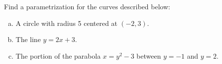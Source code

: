 \documentclass[12pt,letterpaper]{exam}
\begin{document}
\begin{questions}
\newpage
{} Find a parametrization for the curves described below:
	\begin{enumerate}[(a)]
	\item A circle with radius 5 centered at $(-2, 3)$. \vfill
	\sol{%
		\[
		\begin{cases}
		x= 5 \cos(\theta) - 2 \\
		y= 5 \sin(\theta) + 3
		\end{cases}
		\qquad \text{ OR} \qquad \big( 5 \cos(\theta) - 2, 5 \sin(\theta) + 3 \big), \qquad\qquad \theta \in [0,2 \pi]
		\]
	} \vfill
	
	\item The line $y= 2x + 3$. \vfill
	\sol{%
		\[
		\begin{cases}
		x= t \\
		y= 2t + 3
		\end{cases}
		\qquad \text{ OR} \qquad \big( t, \; 2t + 3 \big), \qquad\qquad t \in (-\infty, \infty)
		\]
	} \vfill
	
	\item The portion of the parabola $x= y^2 - 3$ between $y= -1$ and $y= 2$. \vfill
	\sol{%
		\[
		\begin{cases}
		x= t^2 - 3 \\
		y= t
		\end{cases}
		\qquad \text{ OR} \qquad \big( t^2 - 3, \; t \big), \qquad\qquad -1 \leq t \leq 2
		\]
	} \vfill
	\end{enumerate}

\end{questions}
\end{document}
